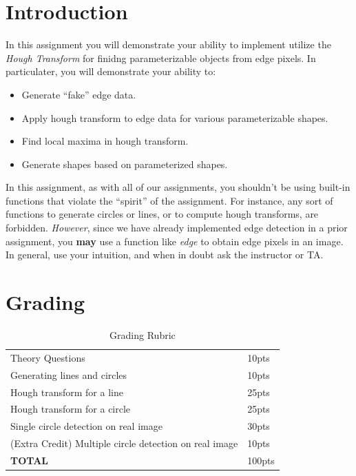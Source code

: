 \documentclass[12pt]{article}
\begin{document}
\maketitle


\section*{Introduction}
In this assignment you will demonstrate your ability to implement utilize the \emph{Hough Transform} for finidng parameterizable objects from edge pixels.  In particulater, you will demonstrate your ability to:
\begin{itemize}
\item Generate ``fake'' edge data.
\item Apply hough transform to edge data for various parameterizable shapes.
\item Find local maxima in hough transform.
\item Generate shapes based on parameterized shapes.
\end{itemize}

\noindent
In this assignment, as with all of our assignments, you shouldn't be using built-in functions that violate the ``spirit'' of the assignment.  For instance, any sort of functions to generate circles or lines, or to compute hough transforms, are forbidden.  \emph{However}, since we have already implemented edge detection in a prior assignment, you \textbf{may} use a function like \emph{edge} to obtain edge pixels in an image.  In general, use your intuition, and when in doubt ask the instructor or TA.\\

\section*{Grading}
\begin{table}[h]
\begin{centering}
\begin{tabular}{|l|l|}
\hline
Theory Questions & 10pts \\
Generating lines and circles & 10pts\\
Hough transform for a line & 25pts\\
Hough transform for a circle & 25pts\\
Single circle detection on real image & 30pts\\
(Extra Credit) Multiple circle detection on real image & 10pts\\

\hline
\textbf{TOTAL} & 100pts\\
\hline
\end{tabular}
\caption{Grading Rubric}
\end{centering}
\end{table}
\end{document}
